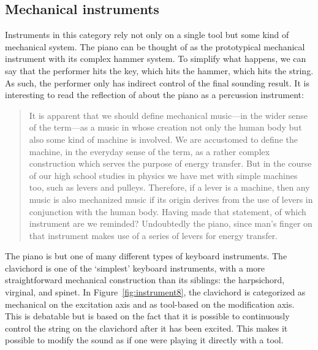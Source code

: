 \subsection{Mechanical instruments}\label{sec:mechanical}

Instruments in this category rely not only on a single tool but some kind of mechanical system. The piano can be thought of as the prototypical mechanical instrument with its complex hammer system. To simplify what happens, we can say that the performer hits the key, which hits the hammer, which hits the string. As such, the performer only has indirect control of the final sounding result. It is interesting to read the reflection of \citet[p.289]{bartok_mechanical_1976} about the piano as a percussion instrument:

\begin{quote}
It is apparent that we should define mechanical music---in the wider sense of the term---as a music in whose creation not only the human body but also some kind of machine is involved. We are accustomed to define the machine, in the everyday sense of the term, as a rather complex construction which serves the purpose of energy transfer. But in the course of our high school studies in physics we have met with simple machines too, such as levers and pulleys. Therefore, if a lever is a machine, then any music is also mechanized music if its origin derives from the use of levers in conjunction with the human body. Having made that statement, of which instrument are we reminded? Undoubtedly the piano, since man's finger on that instrument makes use of a series of levers for energy transfer.
\end{quote}

The piano is but one of many different types of keyboard instruments. The clavichord is one of the `simplest' keyboard instruments, with a more straightforward mechanical construction than its siblings: the harpsichord, virginal, and spinet. In Figure~\ref{fig:instrument8}, the clavichord is categorized as mechanical on the excitation axis and as tool-based on the modification axis. This is debatable but is based on the fact that it is possible to continuously control the string on the clavichord after it has been excited. This makes it possible to modify the sound as if one were playing it directly with a tool.

